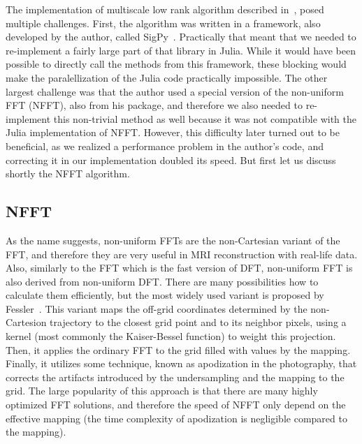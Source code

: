 The implementation of multiscale low rank algorithm described in~\cite{ong_extreme_2020}, posed multiple challenges. First, the algorithm was written in a framework, also developed by the author, called SigPy~\cite{noauthor_sigpy_nodate}. Practically that meant that we needed to re-implement a fairly large part of that library in Julia. While it would have been possible to directly call the methods from this framework, these blocking would make the paralellization of the Julia code practically impossible. The other largest challenge was that the author used a special version of the non-uniform FFT (NFFT), also from his package, and therefore we also needed to re-implement this non-trivial method as well because it was not compatible with the Julia implementation of NFFT. However, this difficulty later turned out to be beneficial, as we realized a performance problem in the author's code, and correcting it in our implementation doubled its speed. But first let us discuss shortly the NFFT algorithm.

\subsection{NFFT}
As the name suggests, non-uniform FFTs are the non-Cartesian variant of the FFT, and therefore they are very useful in MRI reconstruction with real-life data. Also, similarly to the FFT which is the fast version of DFT, non-uniform FFT is also derived from non-uniform DFT. There are many possibilities how to calculate them efficiently, but the most widely used variant is proposed by Fessler~\cite{fessler_nonuniform_2003}. This variant maps the off-grid coordinates determined by the non-Cartesion trajectory to the closest grid point and to its neighbor pixels, using a kernel (most commonly the Kaiser-Bessel function) to weight this projection. Then, it applies the ordinary FFT to the grid filled with values by the mapping. Finally, it utilizes some technique, known as apodization in the photography, that corrects the artifacts introduced by the undersampling and the mapping to the grid. The large popularity of this approach is that there are many highly optimized FFT solutions, and therefore the speed of NFFT only depend on the effective mapping (the time complexity of apodization is negligible compared to the mapping).


